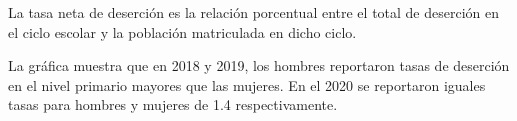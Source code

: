 La tasa neta de deserción es la relación porcentual entre el total de deserción en el ciclo escolar y la población matriculada en dicho ciclo.

La gráfica muestra que en 2018 y 2019, los hombres reportaron tasas de deserción en el nivel primario mayores que las mujeres. En el 2020 se reportaron iguales tasas para hombres y mujeres de 1.4 respectivamente. 